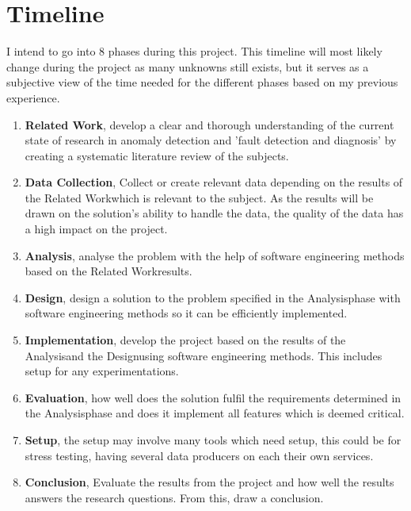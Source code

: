 \documentclass[a4paper,8pt]{article}
\newcommand{\Phases}{8 }
\newcommand{\phaseq}{Related Work}
\newcommand{\phasew}{Data Collection}
\newcommand{\phasee}{Analysis}
\newcommand{\phaser}{Design}
\newcommand{\phaset}{Implementation}
\newcommand{\phaseSetup}{Setup}
\newcommand{\phasey}{Evaluation}
\newcommand{\phaseu}{Conclusion}
\begin{document}
	\section{Timeline}
	I intend to go into \Phases phases during this project. This timeline will most likely change during the project as many unknowns still exists, but it serves as a subjective view of the time needed for the different phases based on my previous experience.
		\begin{enumerate}
			\item \textbf{\phaseq}, develop a clear and thorough understanding of the current state of research in anomaly detection and 'fault detection and diagnosis' by creating a systematic literature review of the subjects.
			\item \textbf{\phasew}, Collect or create relevant data depending on the results of the \phaseq \space which is relevant to the subject. As the results will be drawn on the solution's ability to handle the data, the quality of the data has a high impact on the project.
			\item \textbf{\phasee}, analyse the problem with the help of software engineering methods based on the \phaseq \space results.
			\item \textbf{\phaser}, design a solution to the problem specified in the \phasee \space phase with software engineering methods so it can be efficiently implemented.
			\item \textbf{\phaset}, develop the project based on the results of the \phasee \space and the \phaser \space using software engineering methods. This includes setup for any experimentations.
			\item \textbf{\phasey}, how well does the solution fulfil the requirements determined in the \phasee \space phase and does it implement all features which is deemed critical.
			\item \textbf{\phaseSetup}, the setup may involve many tools which need setup, this could be for stress testing, having several data producers on each their own services.
			\item \textbf{\phaseu}, Evaluate the results from the project and how well the results answers the research questions. From this, draw a conclusion.
		\end{enumerate}
	
\end{document}
